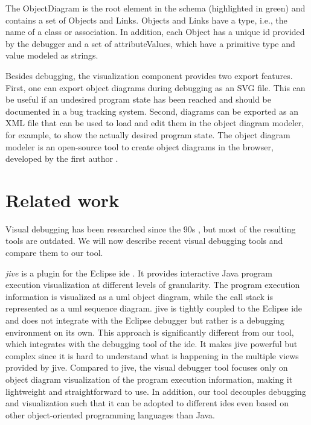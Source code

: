 \documentclass[conference]{IEEEtran}
\begin{document}
The \textsf{ObjectDiagram} is the root element in the schema (highlighted in green) and contains a set of \textsf{Objects} and \textsf{Links}.
\textsf{Objects} and \textsf{Links} have a \textsf{type}, i.e., the name of a class or association.
In addition, each \textsf{Object} has a unique \textsf{id} provided by the debugger and a set of \textsf{attributeValues}, which have a primitive \textsf{type} and \textsf{value} modeled as strings.

Besides debugging, the visualization component provides two export features.
First, one can export object diagrams during debugging as an SVG file.
This can be useful if an undesired program state has been reached and should be documented in a bug tracking system.
Second, diagrams can be exported as an XML file that can be used to load and edit them in the object diagram modeler, for example, to show the actually desired program state.
The object diagram modeler is an open-source tool to create object diagrams in the browser, developed by the first author \cite{ObjectDiagramModeler2022}.

\section{Related work} \label{sec:relatedWork}
Visual debugging has been researched since the 90s \cite{baeza-yatesVisualDebuggingAutomatic1996, jerdingUsingVisualizationFoster1994, mukherjeaVisualDebuggingIntegrating1994, hansonSimpleExtensibleGraphical1997}, but most of the resulting tools are outdated.
We will now describe recent visual debugging tools and compare them to our tool.

\textit{\gls*{jive}} is a plugin for the Eclipse \gls*{ide} \cite{czyzDeclarativeVisualDebugging2007,k.p.FiniteStateModel2021, JIVEJavaInteractive}.
It provides interactive Java program execution visualization at different levels of granularity.
The program execution information is visualized as a \gls*{uml} object diagram, while the call stack is represented as a \gls*{uml} sequence diagram.
\gls*{jive} is tightly coupled to the Eclipse \gls*{ide} and does not integrate with the Eclipse debugger but rather is a debugging environment on its own.
This approach is significantly different from our tool, which integrates with the debugging tool of the \gls*{ide}.
It makes \gls*{jive} powerful but complex since it is hard to understand what is happening in the multiple views provided by \gls*{jive}.
Compared to \gls*{jive}, the visual debugger tool focuses only on object diagram visualization of the program execution information, making it lightweight and straightforward to use.
In addition, our tool decouples debugging and visualization such that it can be adopted to different \glspl*{ide} even based on other object-oriented programming languages than Java.
\end{document}
